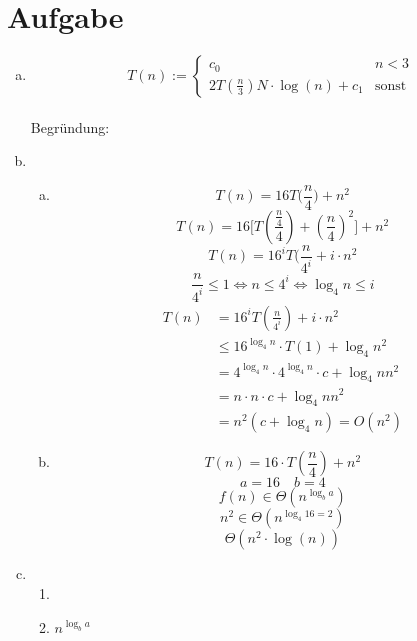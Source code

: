 \documentclass[a4paper,fleqn]{scrartcl}
\begin{document}
\section{Aufgabe}
\begin{enumerate}[a)]
 \item
 \[ T(n):= \begin{cases}
    c_0 & n < 3 \\ 
    2T\left( \frac{n}{3} \right) N \cdot \log(n) + c_1 & \text{sonst}
   \end{cases}\] \\
   Begründung: \\
 \item
 \begin{enumerate}[(a)]
  \item \[ T(n) = 16 T\Big(\frac n 4\Big) + n^2 \]
\[ T(n) = 16 \Big[T(\frac {\frac n 4} 4) + (\frac n 4)^2 \Big] + n^2\]
\[ T(n) = 16^i T(\frac n {4^i} + i \cdot n^2\]
\[ \frac n {4^i} \leq 1 \Leftrightarrow n \leq 4^i \Leftrightarrow \log_4 n \leq i \]
\begin{align*}
T(n) &= 16^i T(\frac n {4^i}) + i \cdot n^2\\
     &\leq 16^{\log_4 n} \cdot T(1) + \log_4 n^2\\
     &= 4^{\log_4 n} \cdot 4^{\log_4 n} \cdot c + \log_4 n n^2\\
     &= n \cdot n \cdot c + \log_4 n n^2\\
     &= n^2 (c + \log_4 n) = O(n^2)
\end{align*}
  \item \[ T(n) = 16 \cdot T\left( \frac{n}{4} \right) + n^2 \]
\[ a= 16 \quad b = 4 \]
\[ f(n) \in \Theta \left( n^{\log_b a} \right) \]
\[ n^2 \in \Theta \left( n^{\log_4 16=2} \right) \]
\[ \Theta \left(n^2 \cdot \log(n)\right) \]
 \end{enumerate}

 \item 
 \begin{enumerate}[1.]
  \item 
  \item $ n^{\log_b a} $
 \end{enumerate}

\end{enumerate}
 
\end{document}
